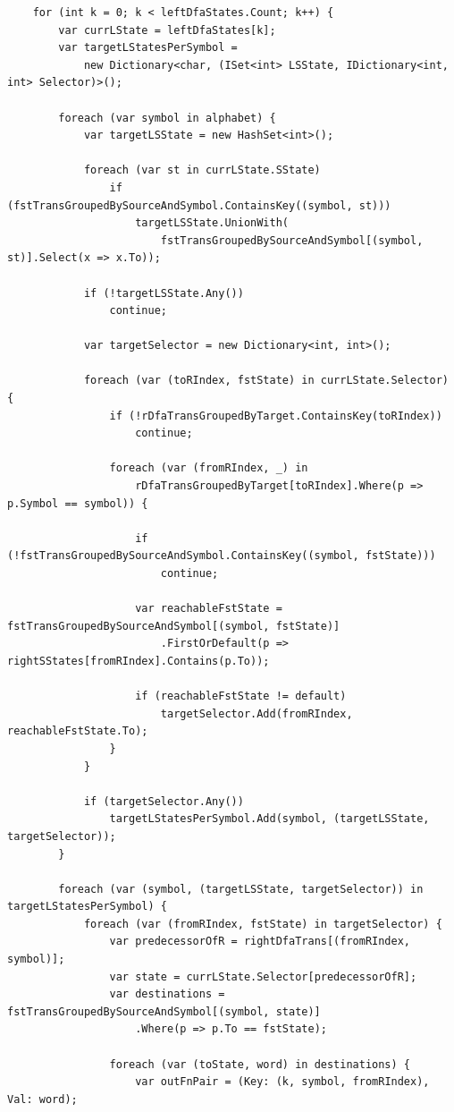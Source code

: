 \documentclass[12pt, oneside]{article}
\theoremstyle{definition}
\begin{document}
\begin{verbatim}
    for (int k = 0; k < leftDfaStates.Count; k++) {
        var currLState = leftDfaStates[k];
        var targetLStatesPerSymbol =
            new Dictionary<char, (ISet<int> LSState, IDictionary<int, int> Selector)>();

        foreach (var symbol in alphabet) {
            var targetLSState = new HashSet<int>();

            foreach (var st in currLState.SState)
                if (fstTransGroupedBySourceAndSymbol.ContainsKey((symbol, st)))
                    targetLSState.UnionWith(
                        fstTransGroupedBySourceAndSymbol[(symbol, st)].Select(x => x.To));

			if (!targetLSState.Any()) 
				continue;

            var targetSelector = new Dictionary<int, int>();

            foreach (var (toRIndex, fstState) in currLState.Selector) {
				if (!rDfaTransGroupedByTarget.ContainsKey(toRIndex)) 
					continue;

                foreach (var (fromRIndex, _) in
					rDfaTransGroupedByTarget[toRIndex].Where(p => p.Symbol == symbol)) {

                    if (!fstTransGroupedBySourceAndSymbol.ContainsKey((symbol, fstState)))
                        continue;

                    var reachableFstState = fstTransGroupedBySourceAndSymbol[(symbol, fstState)]
                        .FirstOrDefault(p => rightSStates[fromRIndex].Contains(p.To));

                    if (reachableFstState != default)
                        targetSelector.Add(fromRIndex, reachableFstState.To);
                }
            }

            if (targetSelector.Any())
                targetLStatesPerSymbol.Add(symbol, (targetLSState, targetSelector));
        }

        foreach (var (symbol, (targetLSState, targetSelector)) in targetLStatesPerSymbol) {
            foreach (var (fromRIndex, fstState) in targetSelector) {
                var predecessorOfR = rightDfaTrans[(fromRIndex, symbol)];
                var state = currLState.Selector[predecessorOfR];
                var destinations = fstTransGroupedBySourceAndSymbol[(symbol, state)]
                    .Where(p => p.To == fstState);

                foreach (var (toState, word) in destinations) {
                    var outFnPair = (Key: (k, symbol, fromRIndex), Val: word);


\end{verbatim}
\end{document}
